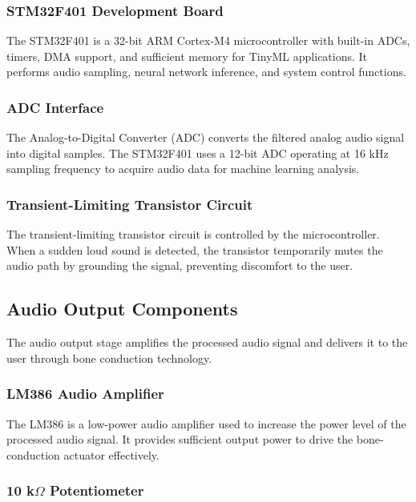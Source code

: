 \subsubsection{STM32F401 Development Board}

The STM32F401 is a 32-bit ARM Cortex-M4 microcontroller with built-in ADCs, timers, DMA support, and sufficient memory for TinyML applications. It performs audio sampling, neural network inference, and system control functions.

\subsubsection{ADC Interface}

The Analog-to-Digital Converter (ADC) converts the filtered analog audio signal into digital samples. The STM32F401 uses a 12-bit ADC operating at 16 kHz sampling frequency to acquire audio data for machine learning analysis.

\subsubsection{Transient-Limiting Transistor Circuit}

The transient-limiting transistor circuit is controlled by the microcontroller. When a sudden loud sound is detected, the transistor temporarily mutes the audio path by grounding the signal, preventing discomfort to the user.

\subsection{Audio Output Components}
The audio output stage amplifies the processed audio signal and delivers it to the user through bone conduction technology.

\subsubsection{LM386 Audio Amplifier}

The LM386 is a low-power audio amplifier used to increase the power level of the processed audio signal. It provides sufficient output power to drive the bone-conduction actuator effectively.

\subsubsection{10 k$\Omega$ Potentiometer}

